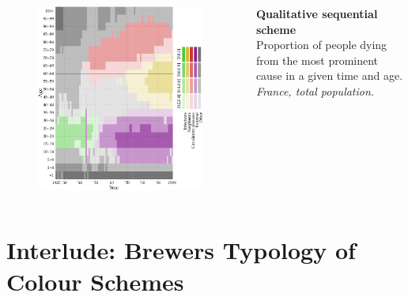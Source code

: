 \documentclass{beamer}
\begin{document}
\begin{frame}
\frametitle{\insertsection}

\begin{columns}[c]

\begin{figure}[htb!]
\includegraphics[width = 0.97\textwidth]{../fig/plot-qual_seq.pdf}
\end{figure}

\footnotesize \textbf{Qualitative sequential scheme}\\ Proportion of people dying from the most prominent cause in a given time and age. \scriptsize\emph{France, total population.}

\end{columns}

\end{frame}

\section{Interlude: Brewers Typology of Colour Schemes} %
\end{document}
